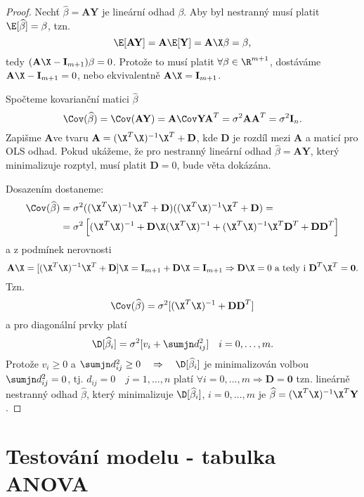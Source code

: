 \begin{proof}
	Nechť $ \widehat{\beta} = \textbf{AY} $ je lineární odhad $ \beta $. Aby byl nestranný musí platit $ \E [ \widehat{\beta} ] = \beta $, tzn. $$ \E [ \textbf{AY} ] = \textbf{A} \E [ \textbf{Y} ] = \textbf{A} \X \beta = \beta, $$
	tedy $ ( \textbf{A} \X - \textbf{I}_{m+1} ) \beta = 0 $. Protože to musí platit $ \forall \beta \in \R ^{m+1} $, dostáváme $ \textbf{A} \X - \textbf{I}_{m+1} = 0 $, nebo ekvivalentně $ \textbf{A} \X = \textbf{I}_{m+1} $.
	
	Spočteme kovarianční matici $ \widehat{\beta} $
$$
	\Cov( \widehat{\beta} ) = \Cov( \textbf{AY} ) = \textbf{A} \Cov \textbf{YA}^{T} = \sigma^{2}\textbf{AA}^{T} = \sigma^{2} \textbf{I}_n.
$$
Zapišme \textbf{A}ve tvaru $ \textbf{A} = ( \X^{T} \X )^{-1} \X ^{T} + \textbf{D} $, kde \textbf{D} je rozdíl mezi \textbf{A} a maticí pro OLS odhad.
Pokud ukážeme, že pro nestranný lineární odhad $ \widehat{\beta} = \textbf{AY} $, který minimalizuje rozptyl, musí platit $ \textbf{D} = 0 $, bude věta dokázána.

Dosazením dostaneme:
\begin{align*}
	\Cov( \widehat{\beta} ) & = \sigma^{2} ( ( \X^{T} \X )^{-1} \X ^{T} + \textbf{D} ) ( ( \X^{T} \X )^{-1} \X ^{T} + \textbf{D} ) = \\
& = \sigma^{2} \left[ ( \X^{T} \X )^{-1} + \textbf{D} \X ( \X^{T} \X )^{-1} + ( \X^{T} \X )^{-1} \X ^{T} \textbf{D}^{T} + \textbf{DD}^{T} \right]
\end{align*}
a z podmínek nerovnosti
$$
\textbf{A} \X = [ ( \X^{T} \X )^{-1} \X ^{T} + \textbf{D} ] \X = \textbf{I}_{m+1} + \textbf{D} \X = \textbf{I}_{m+1}  \Rightarrow  \textbf{D} \X = 0 \text{ a tedy i } \textbf{D}^{T} \X ^{T} = \textbf{0}.
$$
Tzn. 
$$
\Cov( \widehat{\beta} ) = \sigma^{2} [ ( \X ^{T} \X )^{-1} + \textbf{DD}^{T}  ]
$$
a pro diagonální prvky platí
$$
\D [ \widehat{\beta}_i ] = \sigma^{2} [ v_i + \sumjn d_{ij}^{2}  ] \quad i = 0, \dots , m.
$$
Protože $ v_i \geq 0 $ a $ \sumjn d_{ij}^{2} \geq 0 \quad \Rightarrow \quad \D [ \widehat{\beta}_i ] $ je minimalizován volbou $ \sumjn d_{ij}^{2} = 0 $, tj. $ d_{ij} = 0 \quad j = 1, \dots , n $ platí $ \forall i = 0, \dots , m \Rightarrow \textbf{D} = \textbf{0} $ tzn. lineárně nestranný odhad $ \widehat{\beta} $, který minimalizuje $ \D [ \widehat{\beta}_i ] $, $ i = 0, \dots , m $ je $ \widehat{\beta} = ( \X ^{T} \X )^{-1} \X ^{T} \textbf{Y} $.
\end{proof}
\section{Testování modelu - tabulka ANOVA}

